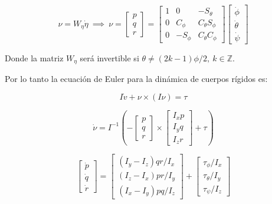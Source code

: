 \documentclass[\main/main.tex]{subfiles}
\begin{document}
\begin{equation}
\nu=W_{\eta}\dot{\eta}\ \implies\ \nu=\begin{bmatrix}p\\
q\\
r
\end{bmatrix}=\begin{bmatrix}1 & 0 & -S_{\theta}\\
0 & C_{\phi} & C_{\theta}S_{\phi}\\
0 & -S_{\phi} & C_{\theta}C_{\phi}
\end{bmatrix}\begin{bmatrix}\dot{\phi}\\
\dot{\theta}\\
\dot{\psi}
\end{bmatrix}\label{eq:138}
\end{equation}

Donde la matriz $W_{\eta}$ será invertible si $\theta\neq(2k-1)\phi/2,\ k\in\mathbb{Z}.$ 

Por lo tanto la ecuación de Euler para la dinámica de cuerpos rígidos
es:

\begin{equation}
I\dot{v}+\nu\times(I\nu)=\tau
\end{equation}

\begin{equation}
\dot{\nu}=I^{-1}\left(-\begin{bmatrix}p\\
q\\
r
\end{bmatrix}\times\begin{bmatrix}I_{x}p\\
I_{y}q\\
I_{z}r
\end{bmatrix}+\tau\right)
\end{equation}

\begin{equation}
\begin{bmatrix}\dot{p}\\
\dot{q}\\
\dot{r}
\end{bmatrix}=\begin{bmatrix}(I_{y}-I_{z})qr/I_{x}\\
(I_{z}-I_{x})pr/I_{y}\\
(I_{x}-I_{y})pq/I_{z}
\end{bmatrix}+\begin{bmatrix}\tau_{\phi}/I_{x}\\
\tau_{\theta}/I_{y}\\
\tau_{\psi}/I_{z}
\end{bmatrix}\label{eq:141}
\end{equation}
\end{document}
